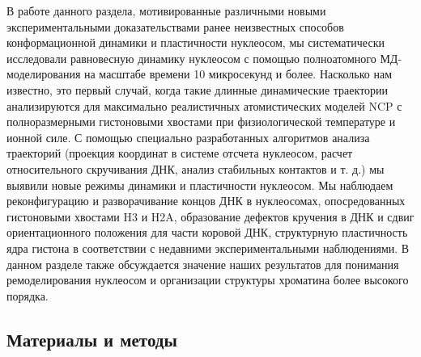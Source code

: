 В работе данного раздела, мотивированные различными новыми экспериментальными доказательствами ранее неизвестных способов конформационной динамики и пластичности нуклеосом, мы систематически исследовали равновесную динамику нуклеосом с помощью полноатомного МД-моделирования на масштабе времени 10 микросекунд и более.
Насколько нам известно, это первый случай, когда такие длинные динамические траектории анализируются для максимально реалистичных атомистических моделей NCP с полноразмерными гистоновыми хвостами при физиологической температуре и ионной силе. С помощью специально разработанных алгоритмов анализа траекторий (проекция координат в системе отсчета нуклеосом, расчет относительного скручивания ДНК, анализ стабильных контактов и т. д.) мы выявили новые режимы динамики и пластичности нуклеосом. Мы наблюдаем реконфигурацию и разворачивание концов ДНК в нуклеосомах, опосредованных гистоновыми хвостами H3 и H2A, образование дефектов кручения в ДНК и сдвиг ориентационного положения для части коровой ДНК, структурную пластичность ядра гистона в соответствии с недавними экспериментальными наблюдениями. В данном разделе также обсуждается значение наших результатов для понимания ремоделирования нуклеосом и организации структуры хроматина более высокого порядка.


\subsection{Материалы и методы}
